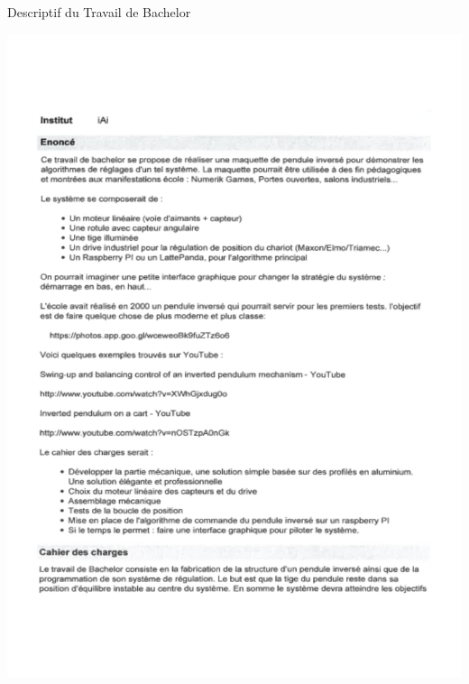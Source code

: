 \documentclass[
    iai, %
    mi, %
]{heig-tb}
\begin{document}
\maketitle
\frontmatter
\clearemptydoublepage

\raggedbottom
\preamble
\authentification
\clearemptydoublepage

\centerline{\Large{Descriptif du Travail de Bachelor}}
\includegraphics[width = \textwidth]{assets/figures/DescriptifAvant.svg}
\end{document}
